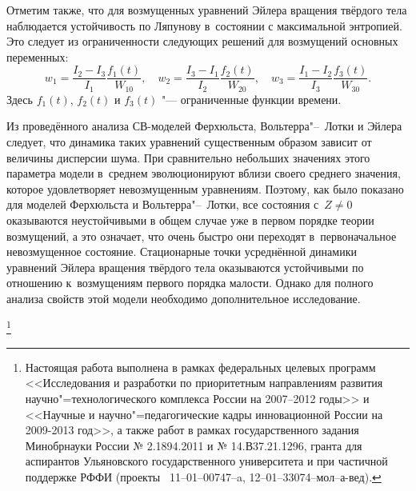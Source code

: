 Отметим также, что для возмущенных уравнений Эйлера вращения твёрдого тела наблюдается устойчивость по Ляпунову в~состоянии с максимальной энтропией. 
Это следует из ограниченности следующих решений для возмущений основных переменных:
\begin{equation}
w_1= \frac {I_2-I_3}{I_1} \frac {f_1(t)}{W_{10}}, \quad w_2= \frac
{I_3-I_1}{I_2} \frac {f_2(t)}{W_{20}}, \quad w_3= \frac
{I_1-I_2}{I_3} \frac {f_3(t)}{W_{30}}.
\end{equation}
Здесь $f_1(t)$, $f_2(t)$ и $f_3(t)$ "--- ограниченные функции
времени.


\smallskip

 Из проведённого анализа СВ-моделей Ферхюльста, Вольтерра"--~Лотки и Эйлера следует, что динамика
таких уравнений существенным образом зависит от величины дисперсии шума. 
При сравнительно небольших значениях этого параметра модели в~среднем эволюционируют вблизи своего среднего значения, которое удовлетворяет невозмущенным уравнениям. 
Поэтому, как было показано для моделей Ферхюльста и Вольтерра"--~Лотки, все состояния с~$Z\not =0$ оказываются неустойчивыми в общем случае уже в первом порядке теории возмущений,  а это означает, что очень быстро они переходят в~первоначальное невозмущенное состояние. 
Стационарные точки усреднённой динамики уравнений Эйлера вращения твёрдого тела оказываются устойчивыми по отношению к~возмущениям первого порядка малости. 
Однако для полного анализа свойств этой модели необходимо дополнительное исследование.

{\thanks{Настоящая работа выполнена в рамках федеральных целевых
программ <<Исследования и разработки по приоритетным направлениям
развития научно"=технологического комплекса России на 2007--2012
годы>> и <<Научные и научно"=педагогические кадры инновационной
России на 2009-2013 год>>, а также работ в рамках
государственного задания Минобрнауки России № 2.1894.2011 и №
14.В37.21.1296, гранта для аспирантов Ульяновского
государственного университета и при частичной поддержке РФФИ
(проекты \rm \No~11--01--00747--a, 12--01--33074--мол--а-вед).} }


